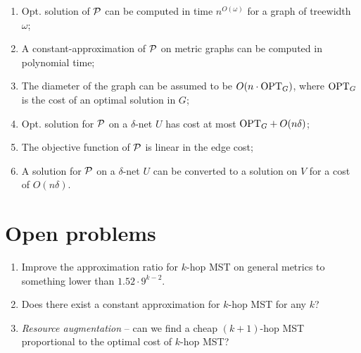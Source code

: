 \begin{multicols}{3}
{\begin{enumerate}
			\item Opt. solution of $\mathcal{P}$ can be computed in time $n^{O(\omega)}$ for a graph of treewidth $\omega$;
			\item A constant-approximation of $\mathcal{P}$ on metric graphs can be computed in polynomial time;
			\item The diameter of the graph can be assumed to be $O(n\cdot \mathrm{OPT}_G)$, where $\mathrm{OPT}_G$ is the cost of an optimal solution in $G$;
			\item Opt. solution for $\mathcal{P}$ on a $\delta$-net $U$ has cost at most $\mathrm{OPT}_G + O(n\delta)$;
			\item The objective function of $\mathcal{P}$ is linear in the edge cost;
			\item A solution for $\mathcal{P}$ on a $\delta$-net $U$ can be converted to a solution on $V$ for a cost of $O(n\delta)$.
		\end{enumerate}
}
              

\section{Open problems}

\begin{enumerate}
\item Improve the approximation ratio for $k$-hop MST on general metrics to something lower than
  $1.52\!\cdot\! 9^{k-2}$.
\item Does there exist a constant approximation for $k$-hop MST for any $k$?
\item \textit{Resource augmentation} -- can we find a cheap $(k+1)$-hop MST proportional to the
  optimal cost of $k$-hop MST?
\end{enumerate}
  
\end{multicols}

